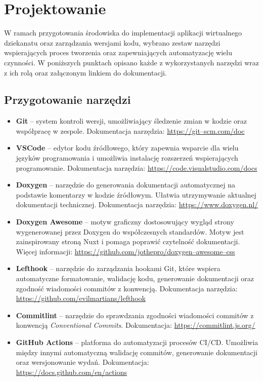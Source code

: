 \newpage
\section{Projektowanie}		%

W ramach przygotowania środowiska do implementacji aplikacji wirtualnego dziekanatu oraz zarządzania wersjami kodu, wybrano zestaw narzędzi wspierających proces tworzenia oraz zapewniających automatyzację wielu czynności. W poniższych punktach opisano każde z wykorzystanych narzędzi wraz z ich rolą oraz załączonym linkiem do dokumentacji.

\subsection{Przygotowanie narzędzi}

\begin{itemize}
  \item \textbf{Git} – system kontroli wersji, umożliwiający śledzenie zmian w kodzie oraz współpracę w zespole. Dokumentacja narzędzia: \url{https://git–scm.com/doc}
  \item \textbf{VSCode} – edytor kodu źródłowego, który zapewnia wsparcie dla wielu języków programowania i umożliwia instalację rozszerzeń wspierających programowanie. Dokumentacja narzędzia: \url{https://code.visualstudio.com/docs}
  \item \textbf{Doxygen} – narzędzie do generowania dokumentacji automatycznej na podstawie komentarzy w kodzie źródłowym. Ułatwia utrzymywanie aktualnej dokumentacji technicznej. Dokumentacja narzędzia: \url{https://www.doxygen.nl/}
  \item \textbf{Doxygen Awesome} – motyw graficzny dostosowujący wygląd strony wygenerowanej przez Doxygen do współczesnych standardów. Motyw jest zainspirowany stroną Nuxt i pomaga poprawić czytelność dokumentacji. Więcej informacji: \url{https://github.com/jothepro/doxygen–awesome–css}
  \item \textbf{Lefthook} – narzędzie do zarządzania hookami Git, które wspiera automatyczne formatowanie, walidację kodu, generowanie dokumentacji oraz zgodność wiadomości commitów z konwencją. Dokumentacja narzędzia: \url{https://github.com/evilmartians/lefthook}
  \item \textbf{Commitlint} – narzędzie do sprawdzania zgodności wiadomości commitów z konwencją \textit{Conventional Commits}. Dokumentacja: \url{https://commitlint.js.org/}
  \item \textbf{GitHub Actions} – platforma do automatyzacji procesów CI/CD. Umożliwia między innymi automatyczną walidację commitów, generowanie dokumentacji oraz wersjonowanie wydań. Dokumentacja: \url{https://docs.github.com/en/actions}
\end{itemize}

